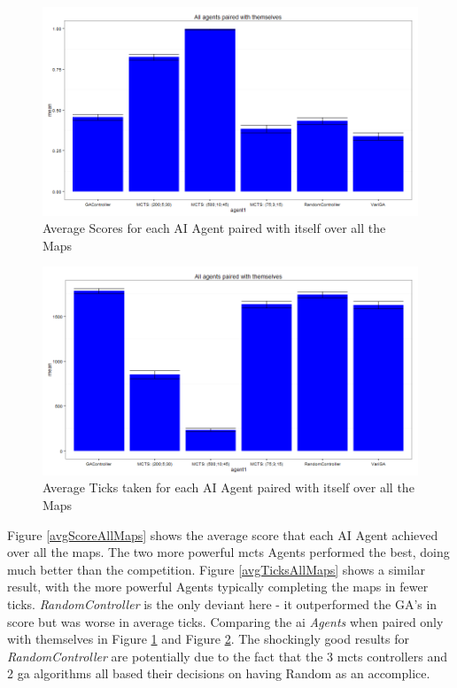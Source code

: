 \documentclass{IEEEtran}
\begin{document}
\begin{figure}[ht]
\centering
\includegraphics[width=\linewidth]{scores-samepairs}
\caption{Average Scores for each AI Agent paired with itself over all the Maps}
\label{avgScorePairAllMaps}
\end{figure}

\begin{figure}[ht]
\centering
\includegraphics[width=\linewidth]{ticks-samepairs}
\caption{Average Ticks taken for each AI Agent paired with itself over all the Maps}
\label{avgTicksPairAllMaps}
\end{figure}

Figure \ref{avgScoreAllMaps} shows the average score that each AI Agent achieved over all the maps. The two more powerful \gls{mcts} Agents performed the best, doing much better than the competition. Figure \ref{avgTicksAllMaps} shows a similar result, with the more powerful Agents typically completing the maps in fewer ticks. \emph{RandomController} is the only deviant here - it outperformed the GA's in score but was worse in average ticks. Comparing the \gls{ai} \emph{Agents} when paired only with themselves in Figure \ref{avgScorePairAllMaps} and Figure \ref{avgTicksPairAllMaps}. The shockingly good results for \emph{RandomController} are potentially due to the fact that the 3 \gls{mcts} controllers and 2 \gls{ga} algorithms all based their decisions on having Random as an accomplice.
\end{document}

